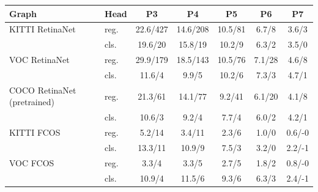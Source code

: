 \begin{tabular}{llccccc}
\toprule
Graph & Head & P3 & P4 & P5 & P6 & P7 \\
\midrule
KITTI RetinaNet & reg. & 22.6/427 & 14.6/208 & 10.5/81 & 6.7/8 & 3.6/3 \\
 & cls. & 19.6/20 & 15.8/19 & 10.2/9 & 6.3/2 & 3.5/0 \\
\addlinespace[3pt]
VOC RetinaNet & reg. & 29.9/179 & 18.5/143 & 10.5/76 & 7.1/28 & 4.6/8 \\
 & cls. & 11.6/4 & 9.9/5 & 10.2/6 & 7.3/3 & 4.7/1 \\
\addlinespace[3pt]
COCO RetinaNet (pretrained) & reg. & 21.3/61 & 14.1/77 & 9.2/41 & 6.1/20 & 4.1/8 \\
 & cls. & 10.6/3 & 9.2/4 & 7.7/4 & 6.0/2 & 4.2/1 \\
\addlinespace[3pt]
KITTI FCOS & reg. & 5.2/14 & 3.4/11 & 2.3/6 & 1.0/0 & 0.6/-0 \\
 & cls. & 13.3/11 & 10.9/9 & 7.5/3 & 3.2/0 & 2.2/-1 \\
\addlinespace[3pt]
VOC FCOS & reg. & 3.3/4 & 3.3/5 & 2.7/5 & 1.8/2 & 0.8/-0 \\
 & cls. & 10.9/4 & 11.5/6 & 9.3/6 & 6.3/3 & 2.4/-1 \\
\bottomrule
\end{tabular}
